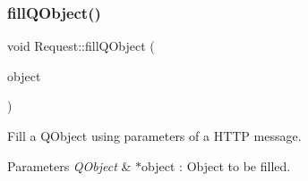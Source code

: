 \subsubsection{\texorpdfstring{fill\+Q\+Object()}{fillQObject()}}
{\footnotesize\ttfamily void Request\+::fill\+Q\+Object (\begin{DoxyParamCaption}\item[{Q\+Object $\ast$}]{object }\end{DoxyParamCaption})}



Fill a Q\+Object using parameters of a H\+T\+TP message. 


\begin{DoxyParams}{Parameters}
{\em Q\+Object} & $\ast$object \+: Object to be filled. \\
\hline
\end{DoxyParams}
